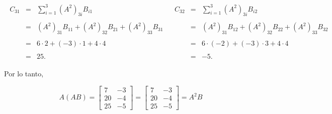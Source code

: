 \begin{enumerate}[1.]
$$\begin{array}{c|c}
	   \begin{array}{rcl}
	       C_{31} &=& \displaystyle \sum_{i=1}^3 (A^2)_{3i}B_{i1}\\\\
		      &=& (A^2)_{31}B_{11} + (A^2)_{32}B_{21} + (A^2)_{33}B_{31}\\\\
		      &=& 6\cdot 2 + (-3)\cdot 1 + 4\cdot 4\\\\
		      &=& 25.
	   \end{array} 
	   &
	   \begin{array}{rcl}
	       C_{32} &=& \displaystyle \sum_{i=1}^3 (A^2)_{3i}B_{i2}\\\\
		      &=& (A^2)_{31}B_{12} + (A^2)_{32}B_{22} + (A^2)_{33}B_{32}\\\\
		      &=& 6\cdot (-2) + (-3)\cdot 3 + 4\cdot 4\\\\
		      &=& -5.
	    \end{array}
       \end{array}
       $$

       Por lo tanto,

       $$A(AB)=\left[\begin{array}{rr}
	   7 & -3\\
	   20 & -4\\
	   25 & -5
       \end{array}\right]
       =
       \left[\begin{array}{rr}
	   7 & -3\\
	   20 & -4\\
	   25 & -5
       \end{array}\right]
       =A^2B$$
       \vspace{.5cm}



\end{enumerate}
